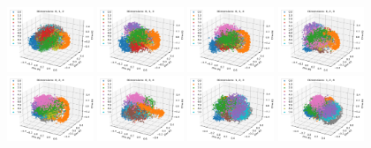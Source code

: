 \documentclass[a4paper, 11pt, twocolumn, draft]{article} %
\begin{document}
\begin{figure}
  \includegraphics[width=0.23\textwidth]{pca/012.png}
  \includegraphics[width=0.23\textwidth]{pca/013.png}
  \includegraphics[width=0.23\textwidth]{pca/014.png}
  \includegraphics[width=0.23\textwidth]{pca/023.png}
  \includegraphics[width=0.23\textwidth]{pca/024.png}
  \includegraphics[width=0.23\textwidth]{pca/034.png}
  \includegraphics[width=0.23\textwidth]{pca/123.png}
  \includegraphics[width=0.23\textwidth]{pca/124.png}

\end{figure}
\end{document}
